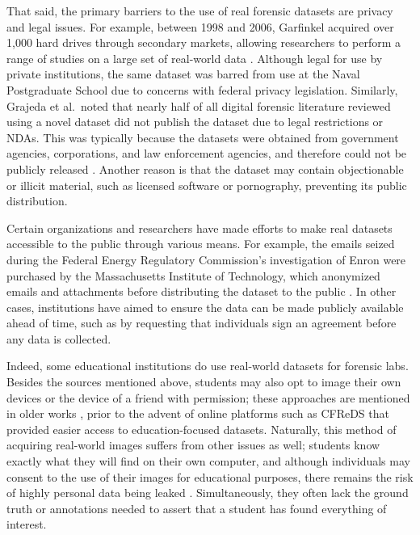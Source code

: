 \documentclass[letterpaper,12pt]{report}
\begin{document}
That said, the primary barriers to the use of real forensic datasets are
privacy and legal issues. For example, between 1998 and 2006, Garfinkel
acquired over 1,000 hard drives through secondary markets, allowing
researchers to perform a range of studies on a large set of real-world
data \cite{garfinkelForensicCorporaChallenge2007}. Although legal
for use by private institutions, the same dataset was barred from use at
the Naval Postgraduate School due to concerns with federal privacy
legislation. Similarly, Grajeda et al.~noted that nearly half of all
digital forensic literature reviewed using a novel dataset did not
publish the dataset due to legal restrictions or NDAs. This was
typically because the datasets were obtained from government agencies,
corporations, and law enforcement agencies, and therefore could not be
publicly released \cite{grajedaAvailabilityDatasetsDigital2017}.
Another reason is that the dataset may contain objectionable or illicit
material, such as licensed software or pornography, preventing its
public distribution.

Certain organizations and researchers have made efforts to make real
datasets accessible to the public through various means. For example,
the emails seized during the Federal Energy Regulatory Commission's
investigation of Enron were purchased by the Massachusetts Institute of
Technology, which anonymized emails and attachments before distributing
the dataset to the public
\cite{yannikosDataCorporaDigital2014,garfinkelForensicCorporaChallenge2007}.
In other cases, institutions have aimed to ensure the data can be made
publicly available ahead of time, such as by requesting that individuals
sign an agreement before any data is collected.

Indeed, some educational institutions do use real-world datasets for
forensic labs. Besides the sources mentioned above, students may also
opt to image their own devices or the device of a friend with
permission; these approaches are mentioned in older works
\cite{andersonComparativeStudyTeaching2006,mochForensicImageGenerator2009},
prior to the advent of online platforms such as CFReDS that provided
easier access to education-focused datasets. Naturally, this method of
acquiring real-world images suffers from other issues as well; students
know exactly what they will find on their own computer, and although
individuals may consent to the use of their images for educational
purposes, there remains the risk of highly personal data being leaked
\cite{garfinkelBringingScienceDigital2009}. Simultaneously, they
often lack the ground truth or annotations needed to assert that a
student has found everything of interest.
\end{document}
